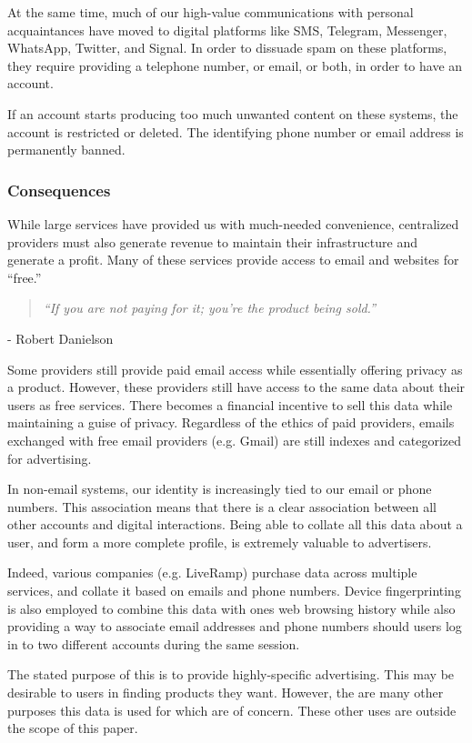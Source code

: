\documentclass{article}
\newcommand{\chapquote}[2]{\begin{quotation} \textit{#1} \end{quotation} \begin{flushright} - #2\end{flushright} }
\begin{document}
At the same time, much of our high-value communications with personal acquaintances have moved to digital platforms like SMS, Telegram, Messenger, WhatsApp, Twitter, and Signal. In order to dissuade spam on these platforms, they require providing a telephone number, or email, or both, in order to have an account.

If an account starts producing too much unwanted content on these systems, the account is restricted or deleted. The identifying phone number or email address is permanently banned.

\subsubsection{Consequences}

While large services have provided us with much-needed convenience, centralized providers must also generate revenue to maintain their infrastructure and generate a profit. Many of these services provide access to email and websites for ``free.''

\chapquote{\large ``If you are not paying for it; you're the product being sold.''}{Robert Danielson}

Some providers still provide paid email access while essentially offering privacy as a product. However, these providers still have access to the same data about their users as free services. There becomes a financial incentive to sell this data while maintaining a guise of privacy. Regardless of the ethics of paid providers, emails exchanged with free email providers (e.g. Gmail) are still indexes and categorized for advertising.

In non-email systems, our identity is increasingly tied to our email or phone numbers. This association means that there is a clear association between all other accounts and digital interactions. Being able to collate all this data about a user, and form a more complete profile, is extremely valuable to advertisers.

Indeed, various companies (e.g. LiveRamp) purchase data across multiple services, and collate it based on emails and phone numbers. Device fingerprinting is also employed to combine this data with ones web browsing history while also providing a way to associate email addresses and phone numbers should users log in to two different accounts during the same session.

The stated purpose of this is to provide highly-specific advertising. This may be desirable to users in finding products they want. However, the are many other purposes this data is used for which are of concern. These other uses are outside the scope of this paper.
\end{document}
